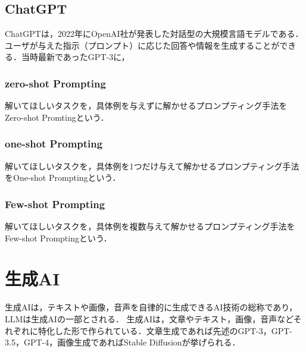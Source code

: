 \subsection{ChatGPT}
ChatGPTは，2022年にOpenAI社が発表した対話型の大規模言語モデルである．ユーザが与えた指示（プロンプト）に応じた回答や情報を生成することができる．当時最新であったGPT-3に，

\subsubsection{zero-shot Prompting}
解いてほしいタスクを，具体例を与えずに解かせるプロンプティング手法をZero-shot Promtingという．

\subsubsection{one-shot Prompting}
解いてほしいタスクを，具体例を1つだけ与えて解かせるプロンプティング手法をOne-shot Promptingという．

\subsubsection{Few-shot Prompting}
解いてほしいタスクを，具体例を複数与えて解かせるプロンプティング手法をFew-shot Promptingという．

\section{生成AI \label{c4s7}}
生成AIは，テキストや画像，音声を自律的に生成できるAI技術の総称であり，LLMは生成AIの一部とされる．
生成AIは，文章やテキスト，画像，音声などそれぞれに特化した形で作られている．文章生成であれば先述のGPT-3，GPT-3.5，GPT-4，画像生成であればStable Diffusionが挙げられる．


